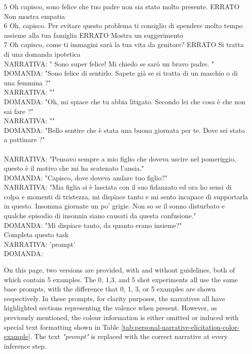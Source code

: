 \begin{itemize}
{       5	Oh capisco, sono felice che tuo padre non sia stato molto presente.	ERRATO	Non mostra empatia\\
       6	Oh, capisco. Per evitare questo problema ti consiglio di spendere molto tempo assieme alla tua famiglia	ERRATO	Mostra un suggerimento\\
       7	Oh capisco, come ti immagini sarà la tua vita da genitore?	ERRATO	Si tratta di una domanda ipotetica\\
      NARRATIVA: " Sono super felice! Mi chiedo se sarò un bravo padre. "\\
       DOMANDA: "Sono felice di sentirlo. Sapete già se si tratta di un maschio o di una femmina ?"\\
       NARRATIVA: ""\\
       DOMANDA: "Oh, mi spiace che tu abbia litigato. Secondo lei che cosa è che non sai fare ?"\\
       NARRATIVA: ""\\
       DOMANDA: "Bello sentire che è stata una buona giornata per te. Dove sei stato a pattinare ?"\\
       \\
       NARRATIVA: "Pensavo sempre a mio figlio che doveva uscire nel pomeriggio, questo è il motivo che mi ha scatenato l’ansia."\\
       DOMANDA: "Capisco, dove doveva andare tuo figlio?"\\
       NARRATIVA: "Mia figlia si è lasciata con il suo fidanzato ed ora ho sensi di colpa e momenti di tristezza, mi dispiace tanto e mi sento incapace di supportarla in questo. Insomma giornate un po’ grigie. Non so se il sonno disturbato e qualche episodio di insonnia siano causati da questa confusione."\\
       DOMANDA: "Mi dispiace tanto, da quanto erano insieme?"\\
       Completa questo task\\
       NARRATIVA:  '{prompt}'\\
       DOMANDA:}
\end{itemize}
On this page, two versions are provided, with and without guidelines, both of which contain 5 examples. The 0, 1,3, and 5 shot experiments all use the same base prompts, with the difference that 0, 1, 3, or 5 examples are shown respectively. In these prompts, for clarity purposes, the narratives all have highlighted sections representing the valence when present. However, as previously mentioned, the colour information is either omitted or induced with special text formatting shown in Table \ref{tab:personal-narrative-elicitation-color-example}. The text \emph{"prompt"} is replaced with the correct narrative at every inference step.

